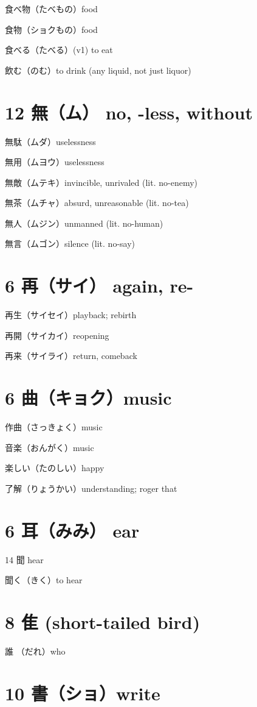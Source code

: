 食べ物（たべもの）food

食物（ショクもの）food

食べる（たべる）(v1) to eat

飲む（のむ）to drink (any liquid, not just liquor)

\section{12 無（ム） no, -less, without}

無駄（ムダ）uselessness

無用（ムヨウ）uselessness

無敵（ムテキ）invincible, unrivaled (lit. no-enemy)

無茶（ムチャ）absurd, unreasonable (lit. no-tea)

無人（ムジン）unmanned (lit. no-human)

無言（ムゴン）silence (lit. no-say)

\section{6 再（サイ） again, re-}

再生（サイセイ）playback; rebirth

再開（サイカイ）reopening

再来（サイライ）return, comeback

\section{6 曲（キョク）music}

作曲（さっきょく）music

音楽（おんがく）music

楽しい（たのしい）happy

了解（りょうかい）understanding; roger that

\section{6 耳（みみ） ear}

14 聞 hear

聞く（きく）to hear

\section{8 隹 (short-tailed bird)}

誰 （だれ）who

\section{10 書（ショ）write}

